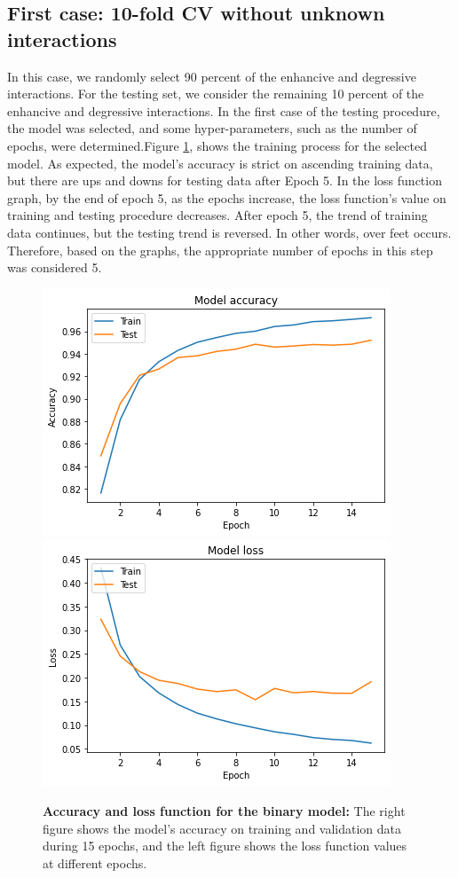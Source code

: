 \documentclass{bmcart}
\begin{document}
\subsection*{First case: 10-fold CV without unknown interactions}
In this case, we randomly select 90 percent of the enhancive and degressive interactions. For the testing set, we consider the remaining 10 percent of the enhancive and degressive interactions. In the first case of the testing procedure,  the model was selected, and some hyper-parameters, such as the number of epochs, were determined.Figure \ref{ModelSelection}, shows the training process for the selected model. As expected, the model's accuracy is strict on ascending training data, but there are ups and downs for testing data after Epoch 5. In the loss function graph, by the end of epoch 5, as the epochs increase, the loss function's value on training and testing procedure decreases. After epoch 5, the trend of training data continues, but the testing trend is reversed. In other words, over feet occurs. Therefore, based on the graphs, the appropriate number of epochs in this step was considered 5.
\begin{figure}[!h]
	\begin{minipage}{1\linewidth} 
		\includegraphics[width=.48\textwidth]{ModelSelection/selectedModelAcc.png} 
		\includegraphics[width=.48\textwidth]{ModelSelection/selectedModelLoss.png} 
	\end{minipage}
	\caption{\textbf{Accuracy and loss function for the binary model:} The right figure shows the model's accuracy on training and validation data during 15 epochs, and the left figure shows the loss function values at different epochs.}
	\label{ModelSelection}
\end{figure}
\end{document}

